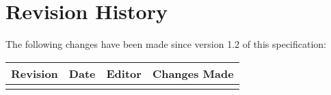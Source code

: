 \chapter{Revision History}
The following changes have been made since version 1.2
of this specification:

\begin{DIFnomarkup}
\begin{longtable}{ | p{} | p{} | p{} | p{} | }
\hline
\textbf{Revision} & \textbf{Date} & \textbf{Editor} & \textbf{Changes Made} \\
\hline
\endhead

& & \\
\hline
\end{longtable}
\end{DIFnomarkup}
